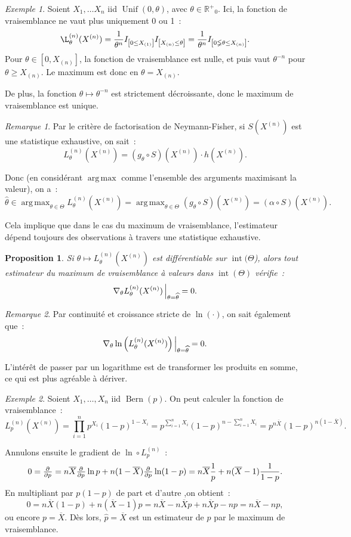 \documentclass{report}
\DeclareMathOperator{\Unif}{Unif}  %
\DeclareMathOperator{\Bern}{Bern}  %
\DeclareMathOperator{\intr}{int}  %
\DeclareMathOperator*{\argmax}{arg\,max}
\newcommand{\Rp}{{\mathbb R^+}}
\newcommand{\charfun}[1]{I_{\left[#1\right]}}
\newcommand{\n}{{(n)}}
\newcommand{\Xn}{{X^\n}}
\newtheorem{prp}[thm]{Proposition}
\theoremstyle{definition}
\theoremstyle{remark}
\newtheorem*{rmq}{Remarque}
\newtheorem{ex}{Exemple}[chapter]
\begin{document}
			\begin{ex} Soient $X_1, \ldots X_n$ iid $\Unif(0, \theta)$, avec $\theta \in \Rp_0$. Ici, la fonction de vraisemblance ne vaut plus uniquement 0 ou 1~:
			\[\L_\theta^\n(\Xn) = \frac 1{\theta^n}\charfun {0 \leq X_{(1)}}\charfun {X_\n \leq \theta} = \frac 1{\theta^n}\charfun {0 \lneqq \theta \leq X_\n}.\]
			Pour $\theta \in [0, X_\n]$, la fonction de vraisemblance est nulle, et puis vaut $\theta^{-n}$ pour $\theta \geq X_\n$. Le maximum est donc en
			$\theta = X_\n$.

			De plus, la fonction $\theta \mapsto \theta^{-n}$ est strictement décroissante, donc le maximum de vraisemblance est unique.
			\end{ex}

			\begin{rmq} Par le critère de factorisation de Neymann-Fisher, si $S(\Xn)$ est une statistique exhaustive, on sait~:
			\[L_\theta^\n(\Xn) = (g_\theta \circ S)(\Xn) \cdot h(\Xn).\]

			Donc (en considérant $\argmax$ comme l'ensemble des arguments maximisant la valeur), on a~:
			\[\widehat \theta \in \argmax_{\theta \in \Theta}L_\theta^\n(\Xn) = \argmax_{\theta \in \Theta}(g_\theta \circ S)(\Xn) = (\alpha \circ S)(\Xn).\]

			Cela implique que dans le cas du maximum de vraisemblance, l'estimateur dépend toujours des observations à travers une statistique exhaustive.
			\end{rmq}

			\begin{prp} Si $\theta \mapsto L_\theta^\n(\Xn)$ est différentiable sur $\intr(\Theta$), alors tout estimateur du maximum de vraisemblance à valeurs dans
			$\intr(\Theta)$ vérifie~:
			\[\nabla_\theta L_\theta^\n(\Xn)\sVert[2]_{\theta=\widehat \theta} = 0.\]
			\end{prp}

			\begin{rmq} Par continuité et croissance stricte de $\ln(\cdot)$, on sait également que~:
			\[\nabla_\theta \ln\left(L_\theta^\n(\Xn)\right)\sVert[2]_{\theta = \widehat \theta} = 0.\]

			L'intérêt de passer par un logarithme est de transformer les produits en somme, ce qui est plus agréable à dériver.
			\end{rmq}

			\begin{ex} Soient $X_1, \ldots, X_n$ iid $\Bern(p)$. On peut calculer la fonction de vraisemblance~:
			\[L_p^\n(\Xn) = \prod_{i=1}^np^{X_i}(1-p)^{1-X_i} = p^{\sum_{i=1}^nX_i}(1-p)^{n-\sum_{i=1}^nX_i} = p^{n\overline X}(1-p)^{n(1-\overline X)}.\]

			Annulons ensuite le gradient de $\ln \circ L_p^\n$~:
			\[0 = \pd {}p = n\overline X\pd {}p\ln p  + n(1-\overline X)\pd {}p\ln(1-p) = n\overline X\frac 1p + n(\overline X - 1)\frac 1{1-p}.\]
			En multipliant par $p(1-p)$ de part et d'autre ,on obtient~:
			\[0 = n\overline X(1-p) + n(\overline X - 1)p = n\overline X - n\overline Xp + n\overline Xp - np = n\overline X - np,\]
			ou encore $p = \overline X$. Dès lors, $\widehat p = \overline X$ est un estimateur de $p$ par le maximum de vraisemblance.
			\end{ex}
\end{document}
